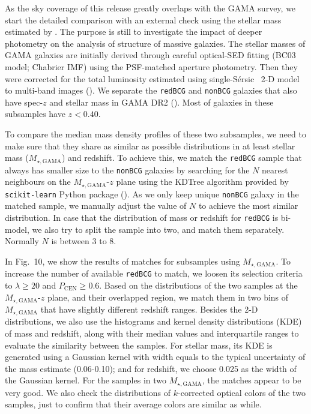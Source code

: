 \documentclass[preprint]{aastex}
\def\ser{{S\'{e}rsic\ }}
\begin{document}
\begin{CJK*}{UTF8}{gbsn}
    As the sky coverage of this release greatly overlaps with the GAMA survey,
    we start the detailed comparison with an external check using the stellar
    mass estimated by \citep{Taylor2011}. 
    The purpose is still to investigate the impact of deeper photometry on 
    the analysis of structure of massive galaxies.  
    The stellar masses of GAMA galaxies are initially derived through careful 
    optical-SED fitting (BC03 model; Chabrier IMF) using the PSF-matched 
    aperture photometry.  
    Then they were corrected for the total luminosity estimated using single-\ser 
    2-D model to multi-band images (\citealt{Kelvin2012}).  
    We separate the \texttt{redBCG} and \texttt{nonBCG} galaxies that also have 
    spec-$z$ and stellar mass in GAMA DR2 (\citealt{Liske2015}).
    Most of galaxies in these subsamples have $z < 0.40$. 
    
    To compare the median mass density profiles of these two subsamples, we 
    need to make sure that they share as similar as possible distributions in 
    at least stellar mass ($M_{\star, \mathrm{GAMA}}$) and redshift. 
    To achieve this, we match the \texttt{redBCG} sample that always has 
    smaller size to the \texttt{nonBCG} galaxies by searching for the $N$ 
    nearest neighbours on the $M_{\star, \mathrm{GAMA}}$-$z$ plane using the
    KDTree algorithm provided by \texttt{scikit-learn} Python package 
    (\citealt{scikit-learn}). 
    As we only keep unique \texttt{nonBCG} galaxy in the matched sample, 
    we manually adjust the value of $N$ to achieve the most similar distribution. 
    In case that the distribution of mass or redshift for \texttt{redBCG} is 
    bi-model, we also try to split the sample into two, and match them separately.
    Normally $N$ is between 3 to 8. 
    
    In Fig.~10, we show the results of matches for subsamples using 
    $M_{\star, \mathrm{GAMA}}$.  
    To increase the number of available \texttt{redBCG} to match, we loosen 
    its selection criteria to $\lambda \ge 20$ and $P_{\mathrm{CEN}} \ge 0.6$.
    Based on the distributions of the two samples at the $M_{\star, \mathrm{GAMA}}$-$z$ 
    plane, and their overlapped region, we match them in two bins of 
    $M_{\star, \mathrm{GAMA}}$ that have slightly different redshift ranges. 
    Besides the 2-D distributions, we also use the histograms and kernel 
    density distributions (KDE) of mass and redshift, along with their median values 
    and interquartile ranges to evaluate the similarity between the samples. 
    For stellar mass, its KDE is generated using a Gaussian kernel with width 
    equals to the typical uncertainty of the mass estimate (0.06-0.10); and 
    for redshift, we choose 0.025 as the width of the Gaussian kernel. 
    For the samples in two $M_{\star, \mathrm{GAMA}}$, the matches appear to be
    very good.  
    We also check the distributions of $k$-corrected optical colors of the two 
    samples, just to confirm that their average colors are similar as while. 
    

\end{CJK*}
\end{document}
